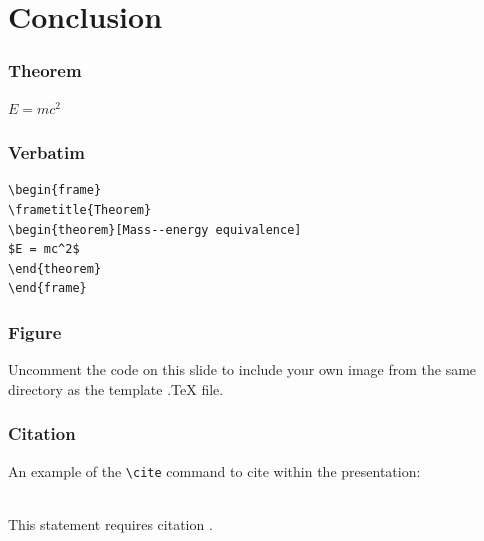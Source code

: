 \documentclass{beamer}
\begin{document}
\section{Conclusion}


\begin{frame}
\frametitle{Theorem}
\begin{theorem}
$E = mc^2$
\end{theorem}
\end{frame}


\begin{frame}[fragile] %
\frametitle{Verbatim}
\begin{example}
\begin{verbatim}
\begin{frame}
\frametitle{Theorem}
\begin{theorem}[Mass--energy equivalence]
$E = mc^2$
\end{theorem}
\end{frame}\end{verbatim}
\end{example}
\end{frame}


\begin{frame}
\frametitle{Figure}
Uncomment the code on this slide to include your own image from the same directory as the template .TeX file.
\end{frame}


\begin{frame}[fragile] %
\frametitle{Citation}
An example of the \verb|\cite| command to cite within the presentation:\\~

This statement requires citation \cite{p1}.
\end{frame}

\end{document}
